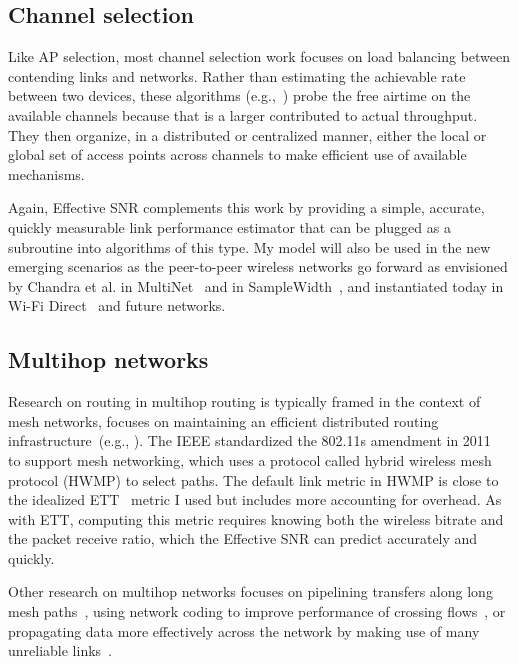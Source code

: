 \subsection{Channel selection}
Like AP selection, most channel selection work focuses on load balancing between contending links and networks. Rather than estimating the achievable rate between two devices, these algorithms (e.g.,~\cite{Akella_Chan,Athanasiou_LAC,Kauffmann_Chan,Rozner_Chan}) probe the free airtime on the available channels because that is a larger contributed to actual throughput. They then organize, in a distributed or centralized manner, either the local or global set of access points across channels to make efficient use of available mechanisms.

Again, Effective SNR complements this work by providing a simple, accurate, quickly measurable link performance estimator that can be plugged as a subroutine into algorithms of this type. My model will also be used in the new emerging scenarios as the peer-to-peer wireless networks go forward as envisioned by Chandra et al. in MultiNet~\cite{Chandra_MultiNet} and in SampleWidth~\cite{Chandra_SampleWidth}, and instantiated today in Wi-Fi Direct~\cite{wifi_direct} and future networks.

\subsection{Multihop networks}
Research on routing in multihop routing is typically  framed in the context of mesh networks, focuses on maintaining an efficient distributed routing infrastructure~(e.g., \cite{Athanasiou_Mesh,RFC_AODV,Draves_ETT,Rozner_SOAR}). The IEEE standardized the 802.11s amendment in 2011~\cite{80211s} to support mesh networking, which uses a protocol called hybrid wireless mesh protocol (HWMP) to select paths. The default link metric in HWMP is close to the idealized ETT~\cite{Draves_ETT} metric I used but includes more accounting for overhead. As with ETT, computing this metric requires knowing both the wireless bitrate and the packet receive ratio, which the Effective SNR can predict accurately and quickly.

Other research on multihop networks focuses on pipelining transfers along long mesh paths~\cite{Li_BlockSwitched,Li_Mesh,Rodrig_thesis}, using network coding to improve performance of crossing flows~\cite{Katti_ANC,Katti_XORs,Ni_CodingRates}, or propagating data more effectively across the network by making use of many unreliable links~\cite{Biswas_ExOR}.

